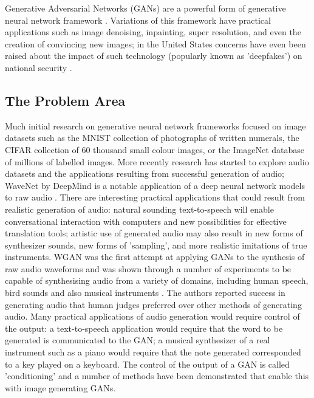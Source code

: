 \documentclass[a4paper, titlepage]{article}
\begin{document}
Generative Adversarial Networks (\ac{GAN}s) are a powerful form of generative neural network framework \citep{2014arXiv1406.2661G}.
Variations of this framework have practical applications such as image denoising, inpainting, super resolution, and even the creation of convincing new images; in the United States concerns have even been raised about the impact of such technology (popularly known as 'deepfakes') on national security \citep{WashPostDeepfakes}.

\subsection{The Problem Area}

Much initial research on generative neural network frameworks focused on image datasets such as the \ac{MNIST} collection of photographs of written numerals, the \ac{CIFAR} collection of 60 thousand small colour images, or the ImageNet database of millions of labelled images.
\newline
\newline
More recently research has started to explore audio datasets and the applications resulting from successful generation of audio; WaveNet by DeepMind is a notable application of a deep neural network models to raw audio \citep{DBLP:journals/corr/OordDZSVGKSK16}.
\newline
\newline
There are interesting practical applications that could result from realistic generation of audio: natural sounding text-to-speech will enable conversational interaction with computers and new possibilities for effective translation tools; artistic use of generated audio may also result in new forms of synthesizer sounds, new forms of 'sampling', and more realistic imitations of true instruments.
\newline
\newline
\ac{WGAN} was the first attempt at applying \ac{GAN}s to the synthesis of raw audio waveforms and was shown through a number of experiments to be capable of synthesising audio from a variety of domains, including human speech, bird sounds and also musical instruments \citep{2018arXiv180204208D}.
The authors reported success in generating audio that human judges preferred over other methods of generating audio. 
\newline
\newline
Many practical applications of audio generation would require control of the output: a text-to-speech application would require that the word to be generated is communicated to the \ac{GAN}; a musical synthesizer of a real instrument such as a piano would require that the note generated corresponded to a key played on a keyboard.
The control of the output of a \ac{GAN} is called 'conditioning' and a number of methods have been demonstrated that enable this with image generating \ac{GAN}s.
\end{document}
